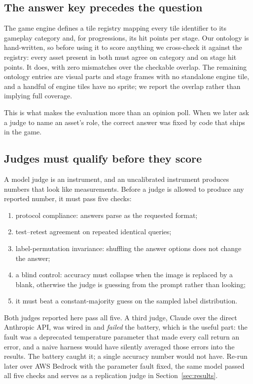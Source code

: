 \documentclass{article}
\begin{document}
\subsection{The answer key precedes the question}

The game engine defines a tile registry mapping every tile identifier to its gameplay category and,
for progressions, its hit points per stage. Our ontology is hand-written, so before using it to
score anything we cross-check it against the registry: every asset present in both must agree on
category and on stage hit points. It does, with zero mismatches over the checkable overlap. The
remaining ontology entries are visual parts and stage frames with no standalone engine tile, and a
handful of engine tiles have no sprite; we report the overlap rather than implying full coverage.

This is what makes the evaluation more than an opinion poll. When we later ask a judge to name an
asset's role, the correct answer was fixed by code that ships in the game.

\subsection{Judges must qualify before they score}

A model judge is an instrument, and an uncalibrated instrument produces numbers that look like
measurements. Before a judge is allowed to produce any reported number, it must pass five checks:

\begin{enumerate}[leftmargin=*,itemsep=1pt]
  \item protocol compliance: answers parse as the requested format;
  \item test--retest agreement on repeated identical queries;
  \item label-permutation invariance: shuffling the answer options does not change the answer;
  \item a blind control: accuracy must collapse when the image is replaced by a blank, otherwise
    the judge is guessing from the prompt rather than looking;
  \item it must beat a constant-majority guess on the sampled label distribution.
\end{enumerate}

Both judges reported here pass all five. A third judge, Claude over the direct Anthropic API, was
wired in and \emph{failed} the battery, which is the useful part: the fault was a deprecated
temperature parameter that made every call return an error, and a naive harness would have silently
averaged those errors into the results. The battery caught it; a single accuracy number would not
have. Re-run later over AWS Bedrock with the parameter fault fixed, the same model passed all five
checks and serves as a replication judge in Section~\ref{sec:results}.
\end{document}
